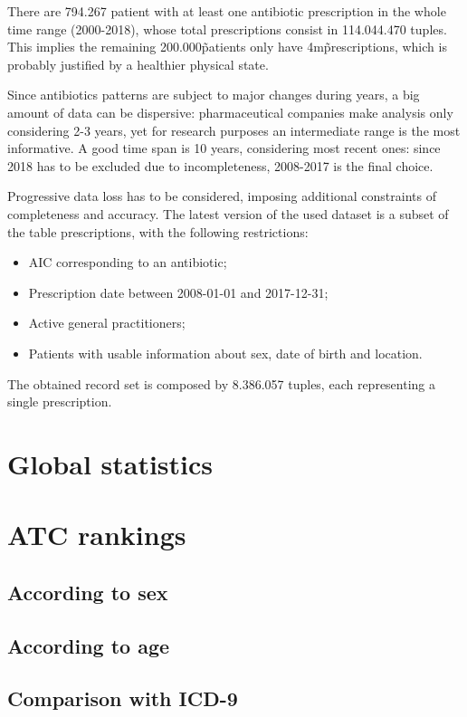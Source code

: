There are 794.267 patient with at least one antibiotic prescription in the whole time range (2000-2018), whose total prescriptions consist in 114.044.470 tuples. This implies the remaining 200.000\~ patients only have 4m\~ prescriptions, which is probably justified by a healthier physical state.

Since antibiotics patterns are subject to major changes during years, a big amount of data can be dispersive: pharmaceutical companies make analysis only considering 2-3 years, yet for research purposes an intermediate range is the most informative. A good time span is 10 years, considering most recent ones: since 2018 has to be excluded due to incompleteness, 2008-2017 is the final choice.

Progressive data loss has to be considered, imposing additional constraints of completeness and accuracy. The latest version of the used dataset is a subset of the table prescriptions, with the following restrictions:
\begin{itemize}
	\item AIC corresponding to an antibiotic;
	\item Prescription date between 2008-01-01 and 2017-12-31;
	\item Active general practitioners;
	\item Patients with usable information about sex, date of birth and location.
\end{itemize}

The obtained record set is composed by 8.386.057 tuples, each representing a single prescription.

\section{Global statistics} %

\section{ATC rankings}

\subsection{According to sex}

\subsection{According to age}

\subsection{Comparison with ICD-9}

